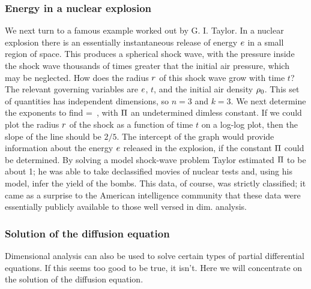\subsubsection{Energy in a nuclear explosion}
We next turn to a famous example worked out by G. I. Taylor. In a nuclear explosion there is an essentially instantaneous release of energy $e$ in a small region of space. This produces a spherical shock wave, with the pressure inside the shock wave thousands of times greater that the initial air pressure, which may be neglected. How does the radius $r$ of this shock wave grow with time $t$? The relevant governing variables are $e$, $t$, and the initial air density $\rho_0$. This set of quantities has independent dimensions, so $n = 3$ and $k = 3$. We next determine the exponents to find
\beq
\radius = \kdim{}\,,
\eeq
with $\Pi$ an undetermined dimless constant. If we could plot the radius $r$ of the shock as a function of time $t$ on a log-log plot, then the slope of the line should be $2/5$. The intercept of the graph would provide information about the energy $e$ released in the explosion, if the constant $\Pi$ could be determined. By solving a model shock-wave problem Taylor estimated $\Pi$ to be about 1; he was able to take declassified movies of nuclear tests and, using his model, infer the yield of the bombs. This data, of course, was strictly classified; it came as a surprise to the American intelligence community that these data were essentially publicly available to those well versed in dim. analysis.


\subsubsection{Solution of the diffusion equation}
Dimensional analysis can also be used to solve certain types of partial differential equations. If this seems too good to be true, it isn't. Here we will concentrate on the solution of the diffusion equation.

